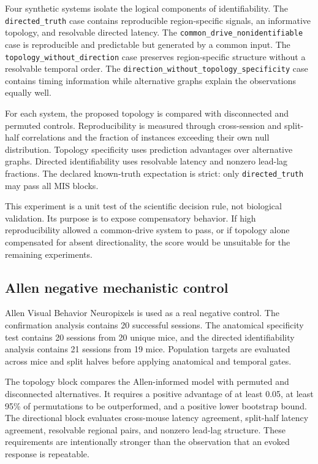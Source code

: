 Four synthetic systems isolate the logical components of identifiability. The
\texttt{directed\_truth} case contains reproducible region-specific signals,
an informative topology, and resolvable directed latency. The
\texttt{common\_drive\_nonidentifiable} case is reproducible and predictable
but generated by a common input. The \texttt{topology\_without\_direction}
case preserves region-specific structure without a resolvable temporal order.
The \texttt{direction\_without\_topology\_specificity} case contains timing
information while alternative graphs explain the observations equally well.

For each system, the proposed topology is compared with disconnected and
permuted controls. Reproducibility is measured through cross-session and
split-half correlations and the fraction of instances exceeding their own null
distribution. Topology specificity uses prediction advantages over alternative
graphs. Directed identifiability uses resolvable latency and nonzero lead-lag
fractions. The declared known-truth expectation is strict: only
\texttt{directed\_truth} may pass all MIS blocks.

This experiment is a unit test of the scientific decision rule, not biological
validation. Its purpose is to expose compensatory behavior. If high
reproducibility allowed a common-drive system to pass, or if topology alone
compensated for absent directionality, the score would be unsuitable for the
remaining experiments.

\subsection{Allen negative mechanistic control}
\label{subsec:allen-negative-control}

Allen Visual Behavior Neuropixels is used as a real negative control. The
confirmation analysis contains 20 successful sessions. The anatomical
specificity test contains 20 sessions from 20 unique mice, and the directed
identifiability analysis contains 21 sessions from 19 mice. Population targets
are evaluated across mice and split halves before applying anatomical and
temporal gates.

The topology block compares the Allen-informed model with permuted and
disconnected alternatives. It requires a positive advantage of at least 0.05,
at least 95\% of permutations to be outperformed, and a positive lower
bootstrap bound. The directional block evaluates cross-mouse latency agreement,
split-half latency agreement, resolvable regional pairs, and nonzero lead-lag
structure. These requirements are intentionally stronger than the observation
that an evoked response is repeatable.

